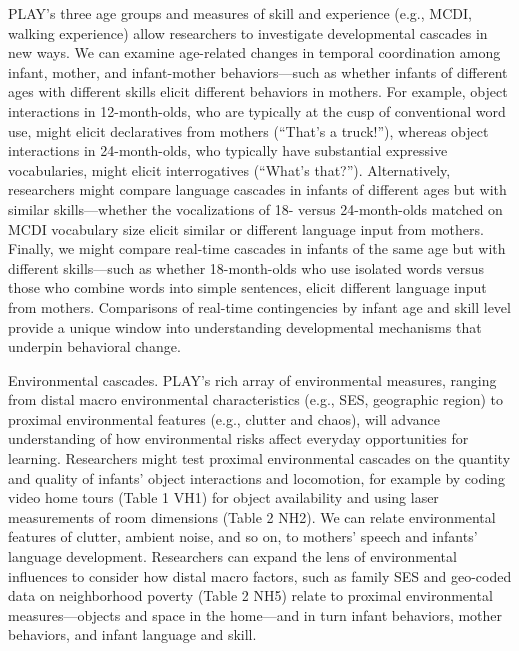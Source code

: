 \documentclass[english,man]{apa6}
\theoremstyle{definition}
\theoremstyle{definition}
\theoremstyle{definition}
\theoremstyle{remark}
\begin{document}
PLAY's three age groups and measures of skill and experience (e.g.,
MCDI, walking experience) allow researchers to investigate developmental
cascades in new ways. We can examine age-related changes in temporal
coordination among infant, mother, and infant-mother behaviors---such as
whether infants of different ages with different skills elicit different
behaviors in mothers. For example, object interactions in 12-month-olds,
who are typically at the cusp of conventional word use, might elicit
declaratives from mothers (\enquote{That's a truck!}), whereas object
interactions in 24-month-olds, who typically have substantial expressive
vocabularies, might elicit interrogatives (\enquote{What's that?}).
Alternatively, researchers might compare language cascades in infants of
different ages but with similar skills---whether the vocalizations of
18- versus 24-month-olds matched on MCDI vocabulary size elicit similar
or different language input from mothers. Finally, we might compare
real-time cascades in infants of the same age but with different
skills---such as whether 18-month-olds who use isolated words versus
those who combine words into simple sentences, elicit different language
input from mothers. Comparisons of real-time contingencies by infant age
and skill level provide a unique window into understanding developmental
mechanisms that underpin behavioral change.

Environmental cascades. PLAY's rich array of environmental measures,
ranging from distal macro environmental characteristics (e.g., SES,
geographic region) to proximal environmental features (e.g., clutter and
chaos), will advance understanding of how environmental risks affect
everyday opportunities for learning. Researchers might test proximal
environmental cascades on the quantity and quality of infants' object
interactions and locomotion, for example by coding video home tours
(Table 1 VH1) for object availability and using laser measurements of
room dimensions (Table 2 NH2). We can relate environmental features of
clutter, ambient noise, and so on, to mothers' speech and infants'
language development. Researchers can expand the lens of environmental
influences to consider how distal macro factors, such as family SES and
geo-coded data on neighborhood poverty (Table 2 NH5) relate to proximal
environmental measures---objects and space in the home---and in turn
infant behaviors, mother behaviors, and infant language and skill.
\end{document}
